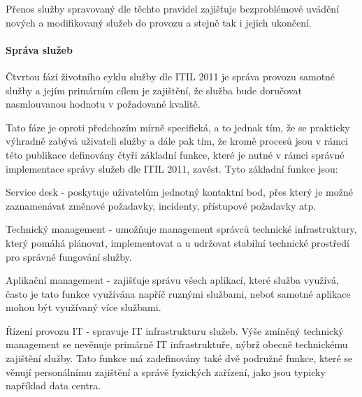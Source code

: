 \documentclass[
  digital,     %
  twoside,     %
  lof,         %
  lot,         %
]{fithesis4}
\begin{document}
Přenos služby spravovaný dle těchto pravidel zajišťuje bezproblémové uvádění nových a modifikovaný služeb do provozu a stejně tak i jejich ukončení. 
\paragraph{Správa služeb}
Čtvrtou fází životního cyklu služby dle ITIL 2011 je správa provozu samotné služby a jejím primárním cílem je zajištění, že služba bude doručovat nasmlouvanou hodnotu v požadované kvalitě.\parencite[s.~36]{Matula2017}

Tato fáze je oproti předchozím mírně specifická, a to jednak tím, že se prakticky výhradně zabývá uživateli služby a dále pak tím, že kromě procesů jsou v rámci této publikace definovány čtyři základní funkce, které je nutné v rámci správné implementace správy služeb dle ITIL 2011, zavést. Tyto základní funkce jsou: \parencite[s.~46]{Carlidge2007}
\begin{compactitem}
    \item Service desk - poskytuje uživatelům jednotný kontaktní bod, přes který je možné zaznamenávat změnové požadavky, incidenty, přístupové požadavky atp. 
    \item Technický management - umožňuje management správců technické infrastruktury, který pomáhá plánovat, implementovat a u udržovat stabilní technické prostředí pro správné fungování služby.
    \item Aplikační management - zajišťuje správu všech aplikací, které služba využívá, často je tato funkce využívána napříč ruznými službami, neboť samotné aplikace mohou být využívaný více službami.
    \item Řízení provozu IT - spravuje IT infrastrukturu služeb. Výše zmíněný technický management se nevěnuje primárně IT infrastruktuře, nýbrž obecně technickému zajištění služby. Tato funkce má zadefinovány také dvě podružné funkce, které se věnují personálnímu zajištění a správě fyzických zařízení, jako jsou typicky například data centra.
\end{compactitem}
\end{document}

